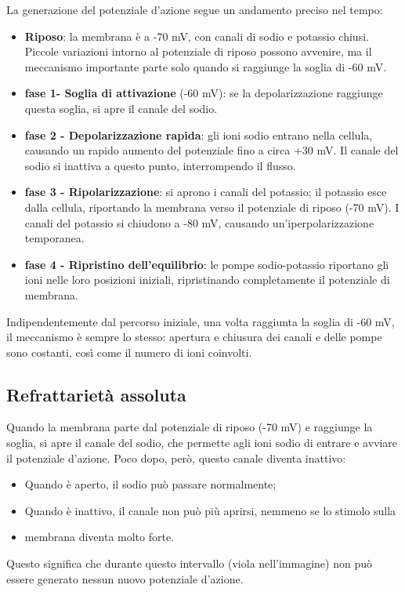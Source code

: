 \documentclass[12pt,a4paper,openany]{book}
\begin{document}
La generazione del potenziale d'azione segue un andamento preciso nel tempo:

\begin{itemize}
  \item \textbf{Riposo}: la membrana è a -70 mV, con canali di sodio e potassio chiusi. Piccole variazioni intorno al potenziale di riposo possono avvenire, ma il meccanismo importante parte solo quando si raggiunge la soglia di -60 mV.
  \item \textbf{fase 1- Soglia di attivazione }(-60 mV): se la depolarizzazione raggiunge questa soglia, si apre il canale del sodio.
  \item \textbf{fase 2 - Depolarizzazione rapida}: gli ioni sodio entrano nella cellula, causando un rapido aumento del potenziale fino a circa +30 mV. Il canale del sodio si inattiva a questo punto, interrompendo il flusso.
  \item \textbf{fase 3 - Ripolarizzazione}: si aprono i canali del potassio; il potassio esce dalla cellula, riportando la membrana verso il potenziale di riposo (-70 mV). I canali del potassio si chiudono a -80 mV, causando un'iperpolarizzazione temporanea.
  \item \textbf{fase 4 - Ripristino dell'equilibrio}: le pompe sodio-potassio riportano gli ioni nelle loro posizioni iniziali, ripristinando completamente il potenziale di membrana.
\end{itemize}
Indipendentemente dal percorso iniziale, una volta raggiunta la soglia di -60 mV, il meccanismo è sempre lo stesso: apertura e chiusura dei canali e delle pompe sono costanti, così come il numero di ioni coinvolti.


\subsection{Refrattarietà assoluta}

Quando la membrana parte dal potenziale di riposo (-70 mV) e raggiunge la soglia, si apre il canale del sodio, che permette agli ioni sodio di entrare e avviare il potenziale d'azione. Poco dopo, però, questo canale diventa inattivo:

\begin{itemize}
  \item Quando è aperto, il sodio può passare normalmente;
  \item Quando è inattivo, il canale non può più aprirsi, nemmeno se lo stimolo sulla
  \item membrana diventa molto forte.
\end{itemize}
Questo significa che durante questo intervallo (viola nell'immagine) non può essere generato nessun nuovo potenziale d'azione.
\end{document}
